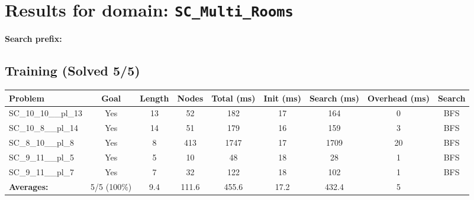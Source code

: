 \documentclass{article}
\begin{document}
\section*{Results for domain: \texttt{SC\_Multi\_Rooms}}
\textbf{Search prefix:} 
\\[0.5cm]
\subsection*{Training (Solved 5/5)}
\begin{tabular}{lcccccccc}
\toprule
Problem & Goal & Length & Nodes & Total (ms) & Init (ms) & Search (ms) & Overhead (ms) & Search \\
\midrule
SC\_10\_10\_\_pl\_13 & Yes & 13 & 52 & 182 & 17 & 164 & 0 & BFS \\
SC\_10\_8\_\_pl\_14 & Yes & 14 & 51 & 179 & 16 & 159 & 3 & BFS \\
SC\_8\_10\_\_pl\_8 & Yes & 8 & 413 & 1747 & 17 & 1709 & 20 & BFS \\
SC\_9\_11\_\_pl\_5 & Yes & 5 & 10 & 48 & 18 & 28 & 1 & BFS \\
SC\_9\_11\_\_pl\_7 & Yes & 7 & 32 & 122 & 18 & 102 & 1 & BFS \\
\textbf{Averages:} & 5/5 (100\%) & 9.4 & 111.6 & 455.6 & 17.2 & 432.4 & 5 & \\
\bottomrule
\end{tabular}
\\[0.7cm]
\end{document}
